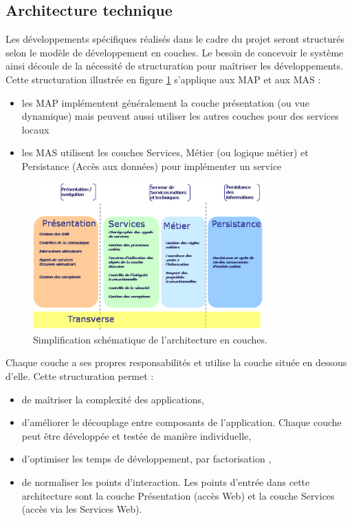 \documentclass[12pt,a4paper]{article}
\begin{document}
\subsection{Architecture technique}
Les développements spécifiques réalisés dans le cadre du projet seront structurés selon le modèle de développement en couches. Le besoin de concevoir le système ainsi découle de la nécessité de structuration pour maîtriser les développements. Cette structuration illustrée en figure \ref{couches} s’applique aux MAP et aux MAS :
\smallbreak
\begin{itemize}
\item	les MAP implémentent généralement la couche présentation (ou vue dynamique) mais peuvent aussi utiliser les autres couches pour des services locaux
\item	les MAS utilisent les couches Services, Métier (ou logique métier) et Persistance (Accès aux données) pour implémenter un service
\end{itemize}
\bigbreak
\begin{figure}[H]
	\begin{center}
		\includegraphics[width=0.8\textwidth,keepaspectratio]{couchesModules.png}
		\caption{Simplification schématique de l'architecture en couches.}
		\label{couches}
	\end{center}
\end{figure}
Chaque couche a ses propres responsabilités et utilise la couche située en dessous d’elle. Cette structuration permet :
\smallbreak
\begin{itemize}
\item	de maîtriser la complexité des applications,
\item	d’améliorer le découplage entre composants de l’application. Chaque couche peut être développée et testée de manière individuelle,
\item	d’optimiser les temps de développement, par factorisation ,
\item	de normaliser les points d’interaction. Les points d’entrée dans cette architecture sont la couche Présentation (accès Web) et la couche Services (accès via les Services Web).
\end{itemize}
\end{document}
